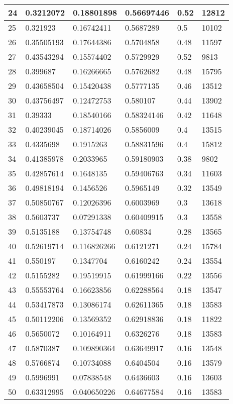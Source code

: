 \begin{longtable}{|l|l|l|l|l|l|}
24 & 0.3212072 & 0.18801898 & 0.56697446 & 0.52 & 12812 \\ \hline 
25 & 0.321923 & 0.16742411 & 0.5687289 & 0.5 & 10102 \\ \hline 
26 & 0.35505193 & 0.17644386 & 0.5704858 & 0.48 & 11597 \\ \hline 
27 & 0.43543294 & 0.15574402 & 0.5729929 & 0.52 & 9813 \\ \hline 
28 & 0.399687 & 0.16266665 & 0.5762682 & 0.48 & 15795 \\ \hline 
29 & 0.43658504 & 0.15420438 & 0.5777135 & 0.46 & 13512 \\ \hline 
30 & 0.43756497 & 0.12472753 & 0.580107 & 0.44 & 13902 \\ \hline 
31 & 0.39333 & 0.18540166 & 0.58324146 & 0.42 & 11648 \\ \hline 
32 & 0.40239045 & 0.18714026 & 0.5856009 & 0.4 & 13515 \\ \hline 
33 & 0.4335698 & 0.1915263 & 0.58831596 & 0.4 & 15812 \\ \hline 
34 & 0.41385978 & 0.2033965 & 0.59180903 & 0.38 & 9802 \\ \hline 
35 & 0.42857614 & 0.1648135 & 0.59406763 & 0.34 & 11603 \\ \hline 
36 & 0.49818194 & 0.1456526 & 0.5965149 & 0.32 & 13549 \\ \hline 
37 & 0.50850767 & 0.12026396 & 0.6003969 & 0.3 & 13618 \\ \hline 
38 & 0.5603737 & 0.07291338 & 0.60409915 & 0.3 & 13558 \\ \hline 
39 & 0.5135188 & 0.13754748 & 0.60834 & 0.28 & 13565 \\ \hline 
40 & 0.52619714 & 0.116826266 & 0.6121271 & 0.24 & 15784 \\ \hline 
41 & 0.550197 & 0.1347704 & 0.6160242 & 0.24 & 13554 \\ \hline 
42 & 0.5155282 & 0.19519915 & 0.61999166 & 0.22 & 13556 \\ \hline 
43 & 0.55553764 & 0.16623856 & 0.62288564 & 0.18 & 13547 \\ \hline 
44 & 0.53417873 & 0.13086174 & 0.62611365 & 0.18 & 13583 \\ \hline 
45 & 0.50112206 & 0.13569352 & 0.62918836 & 0.18 & 11822 \\ \hline 
46 & 0.5650072 & 0.10164911 & 0.6326276 & 0.18 & 13583 \\ \hline 
47 & 0.5870387 & 0.109890364 & 0.63649917 & 0.16 & 13548 \\ \hline 
48 & 0.5766874 & 0.10734088 & 0.6404504 & 0.16 & 13579 \\ \hline 
49 & 0.5996991 & 0.07838548 & 0.6436603 & 0.16 & 13603 \\ \hline 
50 & 0.63312995 & 0.040650226 & 0.64677584 & 0.16 & 13583 \\ \hline 
\end{longtable}